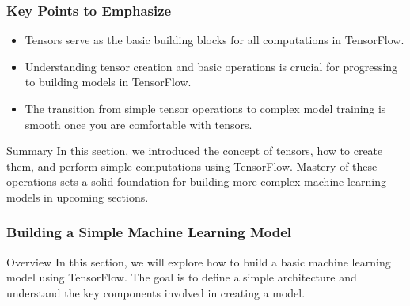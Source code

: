 \documentclass[aspectratio=169]{beamer}
\begin{document}
\begin{frame}
    \frametitle{Key Points to Emphasize}
    \begin{itemize}
        \item Tensors serve as the basic building blocks for all computations in TensorFlow.
        \item Understanding tensor creation and basic operations is crucial for progressing to 
              building models in TensorFlow.
        \item The transition from simple tensor operations to complex model training is smooth once 
              you are comfortable with tensors.
    \end{itemize}
    
    \begin{block}{Summary}
    In this section, we introduced the concept of tensors, how to create them, and 
    perform simple computations using TensorFlow. Mastery of these operations 
    sets a solid foundation for building more complex machine learning models 
    in upcoming sections.
    \end{block}
\end{frame}

\begin{frame}
    \frametitle{Building a Simple Machine Learning Model}
    \begin{block}{Overview}
        In this section, we will explore how to build a basic machine learning model using TensorFlow.
        The goal is to define a simple architecture and understand the key components involved in creating a model.
    \end{block}
\end{frame}
\end{document}
